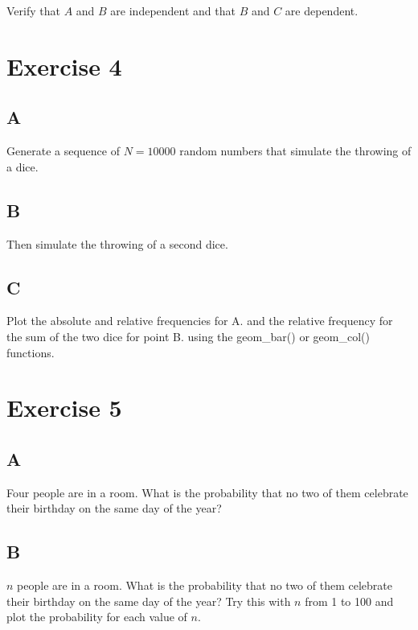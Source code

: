 \documentclass[
]{article}
\begin{document}
Verify that \(A\) and \(B\) are independent and that \(B\) and \(C\) are
dependent.

\hypertarget{exercise-4}{%
\section{Exercise 4}\label{exercise-4}}

\hypertarget{a-3}{%
\subsection{A}\label{a-3}}

Generate a sequence of \(N=10000\) random numbers that simulate the
throwing of a dice.

\hypertarget{b-3}{%
\subsection{B}\label{b-3}}

Then simulate the throwing of a second dice.

\hypertarget{c-2}{%
\subsection{C}\label{c-2}}

Plot the absolute and relative frequencies for A. and the relative
frequency for the sum of the two dice for point B. using the geom\_bar()
or geom\_col() functions.

\hypertarget{exercise-5}{%
\section{Exercise 5}\label{exercise-5}}

\hypertarget{a-4}{%
\subsection{A}\label{a-4}}

Four people are in a room. What is the probability that no two of them
celebrate their birthday on the same day of the year?

\hypertarget{b-4}{%
\subsection{B}\label{b-4}}

\(n\) people are in a room. What is the probability that no two of them
celebrate their birthday on the same day of the year? Try this with
\(n\) from 1 to 100 and plot the probability for each value of \(n\).
\end{document}
